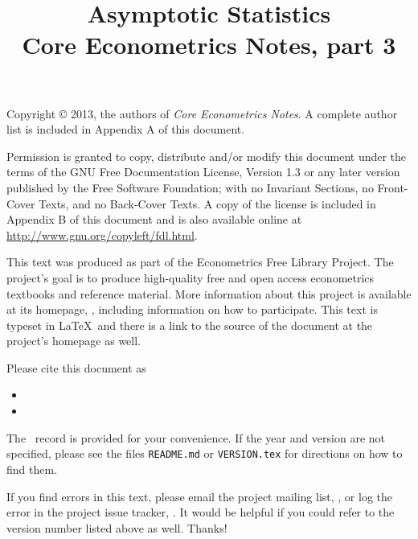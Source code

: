 \documentclass[nohyper]{external/tufte-handout}
\title[Asymptotic statistics]%
{Asymptotic Statistics \\
  Core Econometrics Notes, part 3}
\begin{document}
\maketitle

\bigskip\noindent%
Copyright © 2013, the authors of \textit{Core Econometrics Notes}.
A complete author list is included in Appendix A of this document.

Permission is granted to copy, distribute and/or modify this document
under the terms of the GNU Free Documentation License, Version 1.3 or
any later version published by the Free Software Foundation; with no
Invariant Sections, no Front-Cover Texts, and no Back-Cover Texts.  A
copy of the license is included in Appendix B of this document and is
also available online at \url{http://www.gnu.org/copyleft/fdl.html}.

This text was produced as part of the Econometrics Free Library
Project.  The project's goal is to produce high-quality free and
open access econometrics textbooks and reference material.  More
information about this project is available at its homepage,
\homepage, including information on how
to participate.  This text is typeset in \LaTeX\ and there is a link
to the source of the document at the project's homepage as well.

Please cite this document as
\begin{itemize}
\item[] 
\item[] 
\end{itemize}
The \BibTeX\ record is provided for your convenience.
If the year and version are not specified, please see the files
\texttt{README.md} or \texttt{VERSION.tex} for directions on how to
find them.

If you find errors in this text, please email the project mailing
list, \maillist, or log the error in the project issue tracker,
\bugtrack.  It would be helpful if you could refer to the version
number listed above as well.  Thanks!

\tableofcontents










\end{document}
